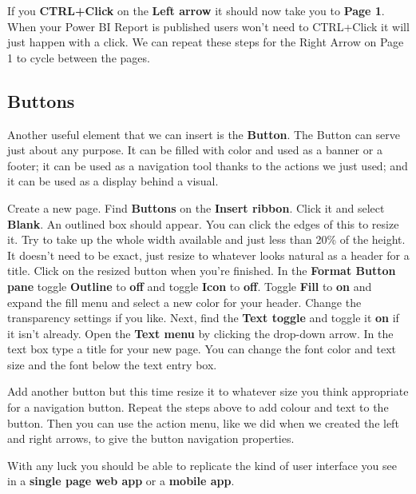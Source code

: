 \documentclass[
]{book}
\begin{document}
If you \textbf{CTRL+Click} on the \textbf{Left arrow} it should now take you to \textbf{Page 1}. When your Power BI Report is published users won't need to CTRL+Click it will just happen with a click. We can repeat these steps for the Right Arrow on Page 1 to cycle between the pages.

\hypertarget{buttons}{%
\subsection{Buttons}\label{buttons}}

Another useful element that we can insert is the \textbf{Button}. The Button can serve just about any purpose. It can be filled with color and used as a banner or a footer; it can be used as a navigation tool thanks to the actions we just used; and it can be used as a display behind a visual.

Create a new page. Find \textbf{Buttons} on the \textbf{Insert ribbon}. Click it and select \textbf{Blank}. An outlined box should appear. You can click the edges of this to resize it. Try to take up the whole width available and just less than 20\% of the height. It doesn't need to be exact, just resize to whatever looks natural as a header for a title.
Click on the resized button when you're finished. In the \textbf{Format Button pane} toggle \textbf{Outline} to \textbf{off} and toggle \textbf{Icon} to \textbf{off}. Toggle \textbf{Fill} to \textbf{on} and expand the fill menu and select a new color for your header. Change the transparency settings if you like. Next, find the \textbf{Text toggle} and toggle it \textbf{on} if it isn't already. Open the \textbf{Text menu} by clicking the drop-down arrow. In the text box type a title for your new page. You can change the font color and text size and the font below the text entry box.

Add another button but this time resize it to whatever size you think appropriate for a navigation button. Repeat the steps above to add colour and text to the button. Then you can use the action menu, like we did when we created the left and right arrows, to give the button navigation properties.

With any luck you should be able to replicate the kind of user interface you see in a \textbf{single page web app} or a \textbf{mobile app}.
\end{document}
